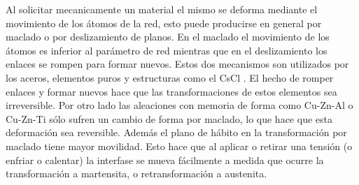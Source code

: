 \documentclass[a4paper,12pt,fleqn,twoside,openany]{book}
\begin{document}
Al solicitar mecanicamente un material el mismo se deforma mediante el movimiento de los átomos de la red, esto puede producirse en general por maclado o por deslizamiento de planos. En el maclado el movimiento de los átomos es inferior al parámetro de red mientras que en el deslizamiento los enlaces se rompen para formar nuevos. 
Estos dos mecanismos son utilizados por los aceros, 
elementos puros y estructuras como el CsCl \cite{duering, elliott}. El hecho de romper enlaces y formar nuevos hace que las transformaciones de estos 
elementos sea irreversible. Por otro lado las aleaciones con memoria de forma como Cu-Zn-Al o Cu-Zn-Ti sólo sufren un cambio de forma por maclado, lo que hace que esta deformación sea reversible. Además el plano de hábito en la transformación por maclado tiene mayor movilidad. Esto hace que al aplicar o retirar una tensión (o enfriar o calentar) la interfase se mueva fácilmente a medida que ocurre la transformación a martensita, o retransformación a austenita.




\end{document}
